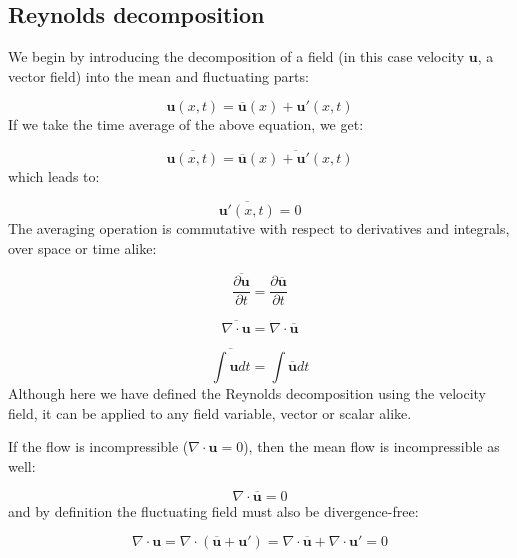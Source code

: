 \documentclass[12pt]{article}
\numberwithin{equation}{section}
\numberwithin{figure}{section}
\numberwithin{table}{section}
\begin{document}
\subsection{Reynolds decomposition}
\label{sec:reynolds_decomposition}

We begin by introducing the decomposition of a field (in this case velocity
$\mathbf{u}$, a vector field) into the mean and fluctuating parts:

\begin{equation}
  \mathbf{u}(x, t) = \overline{\mathbf{u}}(x) + \mathbf{u}'(x, t)
\end{equation}
If we take the time average of the above equation, we get:

\begin{equation}
  \overline{\mathbf{u}(x, t)} = \overline{\overline{\mathbf{u}}(x) + \mathbf{u}'(x, t)}
\end{equation}
which leads to:

\begin{equation}
  \overline{\mathbf{u}'(x, t)} = 0
\end{equation}
The averaging operation is commutative with respect to derivatives and integrals,
over space or time alike:

\begin{equation}
  \overline{\frac{\partial \mathbf{u}}{\partial t}} = \frac{\partial \overline{\mathbf{u}}}{\partial t}
\end{equation}

\begin{equation}
  \overline{\nabla \cdot \mathbf{u}} = \nabla \cdot \overline{\mathbf{u}}
\end{equation}

\begin{equation}
  \overline{\int \mathbf{u} dt} = \int \overline{\mathbf{u}} dt
\end{equation}
Although here we have defined the Reynolds decomposition using the velocity
field, it can be applied to any field variable, vector or scalar alike.

If the flow is incompressible ($\nabla \cdot \mathbf{u} = 0$), then the mean
flow is incompressible as well:

\begin{equation}
  \nabla \cdot \overline{\mathbf{u}} = 0
\end{equation}
and by definition the fluctuating field must also be divergence-free:

\begin{equation}
  \nabla \cdot \mathbf{u} = \nabla \cdot (\overline{\mathbf{u}} + \mathbf{u}') =
  \nabla \cdot \overline{\mathbf{u}} + \nabla \cdot \mathbf{u}' = 0
\end{equation}
\end{document}
